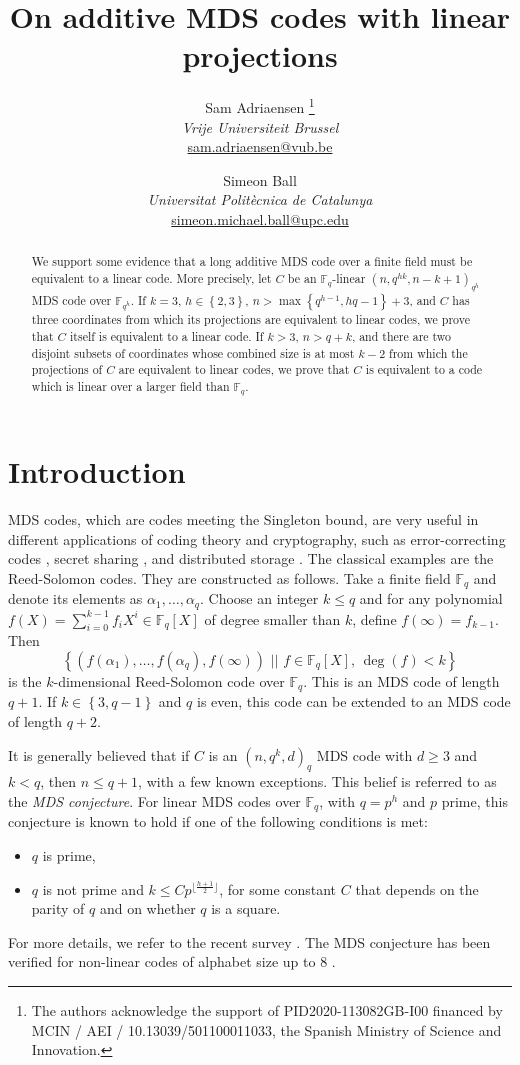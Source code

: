 \documentclass[a4paper]{article}
\title{On additive MDS codes with linear projections}
\author{Sam Adriaensen \thanks{The authors acknowledge the support of PID2020-113082GB-I00 financed by MCIN / AEI / 10.13039/501100011033, the Spanish Ministry of Science and Innovation.} \\ {\it Vrije Universiteit Brussel} \\ \url{sam.adriaensen@vub.be} \and Simeon Ball \footnotemark[1] \\ {\it Universitat Polit\`ecnica de Catalunya} \\ \url{simeon.michael.ball@upc.edu} }
\date{}
\theoremstyle{definition}
\newcommand{\FF}{\mathbb F}
\newcommand{\set}[1]{ \left \{ #1 \right \} }
\newcommand{\sett}[2]{ \left\{ #1 \, \, || \, \, #2 \right \} }
\begin{document}
\maketitle

\begin{abstract}
We support some evidence that a long additive MDS code over a finite field must be equivalent to a linear code.
More precisely, let $C$ be an $\FF_q$-linear $(n,q^{hk},n-k+1)_{q^h}$ MDS code over $\FF_{q^h}$.
If $k=3$, $h \in \set{2,3}$, $n > \max \set{q^{h-1},h q -1} + 3$, and $C$ has three coordinates from which its projections are equivalent to linear codes, we prove that $C$ itself is equivalent to a linear code.
If $k>3$, $n > q+k$, and there are two disjoint subsets of coordinates whose combined size is at most $k-2$ from which the projections of $C$ are equivalent to linear codes, we prove that $C$ is equivalent to a code which is linear over a larger field than $\FF_q$.
\end{abstract}

\section{Introduction}

MDS codes, which are codes meeting the Singleton bound, are very useful in different applications of coding theory and cryptography, such as error-correcting codes \cite[Chapter 6]{ball20}, secret sharing \cite{pieprzykzhang}, and distributed storage \cite{dimakis}.
The classical examples are the Reed-Solomon codes.
They are constructed as follows.
Take a finite field $\FF_q$ and denote its elements as $\alpha_1, \dots, \alpha_q$.
Choose an integer $k\leq q$ and for any polynomial 
\(f(X) = \sum_{i=0}^{k-1} f_i X^i \in \FF_q[X] \)
of degree smaller than $k$, define $f(\infty) = f_{k-1}$.
Then
\[
 \sett{(f(\alpha_1), \dots, f(\alpha_q),f(\infty))}{f \in \FF_q[X], \, \deg(f) < k}
\]
is the $k$-dimensional Reed-Solomon code over $\FF_q$.
This is an MDS code of length $q+1$.
If $k \in \set{3,q-1}$ and $q$ is even, this code can be extended to an MDS code of length $q+2$.

It is generally believed that if $C$ is an $(n,q^k,d)_q$ MDS code with $d \geq 3$ and $k < q$, then $n \leq q+1$, with a few known exceptions.
This belief is referred to as the \emph{MDS conjecture}.
For linear MDS codes over $\FF_q$, with $q=p^h$ and $p$ prime, this conjecture is known to hold if one of the following conditions is met:
\begin{itemize}
    \item $q$ is prime,
    \item $q$ is not prime and $k \leq C p^{\lfloor \frac{h+1}2 \rfloor}$, for some constant $C$ that depends on the parity of $q$ and on whether $q$ is a square.
\end{itemize}
For more details, we refer to the recent survey \cite{balllavrauw19}.
The MDS conjecture has been verified for non-linear codes of alphabet size up to 8 \cite{kokkalakrotovostergard,kokkalaostergard}.
\end{document}
